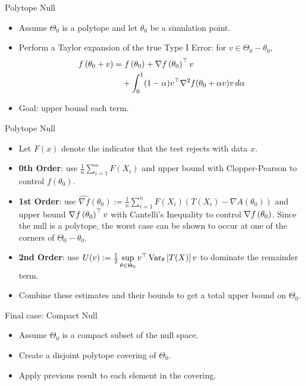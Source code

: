 \begin{frame}{Polytope Null}
\begin{itemize}
    \item Assume $\Theta_0$ is a polytope and let $\theta_0$ be a simulation point. 
    \item Perform a Taylor expansion of the true Type I Error: for $v \in \Theta_0-\theta_0$,
        \begin{align*}
            f\left( \theta_0 + v \right) &= f\left( \theta_0 \right) + \nabla f\left( \theta_0 \right)^\top v 
            \\&\quad + \int_0^1 (1-\alpha) v^\top \nabla^2 f(\theta_0 + \alpha v) v \, d\alpha
        \end{align*}
    \item Goal: upper bound each term.
\end{itemize}
\end{frame}

\begin{frame}{Polytope Null}
\begin{itemize}
    \item Let $F(x)$ denote the indicator that the test rejects with data $x$.
    \item \textbf{0th Order}: use $\frac{1}{n} \sum\limits_{i=1}^n F(X_i)$ and upper bound with Clopper-Pearson to control $f(\theta_0)$.
    \item \textbf{1st Order}: use $\widehat{\nabla f}(\theta_0) := \frac{1}{n} \sum\limits_{i=1}^n F(X_i) (T(X_i) - \nabla A(\theta_0))$
        and upper bound $\nabla f\left( \theta_0 \right)^\top v$ with Cantelli's Inequality to control $\nabla f\left( \theta_0 \right)$.
        Since the null is a polytope, the worst case can be shown to occur at one of the corners of $\Theta_0-\theta_0$.
    \item \textbf{2nd Order}: use $U(v) := \frac{1}{2} \sup\limits_{\theta \in \Theta_0} v^\top \operatorname{Var}_\theta\left[T(X)\right] v$ 
        to dominate the remainder term.
    \item Combine these estimates and their bounds to get a total upper bound on $\Theta_0$.
\end{itemize}
\end{frame}

\begin{frame}{Final case: Compact Null}
\begin{itemize}
    \item Assume $\Theta_0$ is a compact subset of the null space.
    \item Create a disjoint polytope covering of $\Theta_0$.
    \item Apply previous result to each element in the covering.
\end{itemize}
\end{frame}

